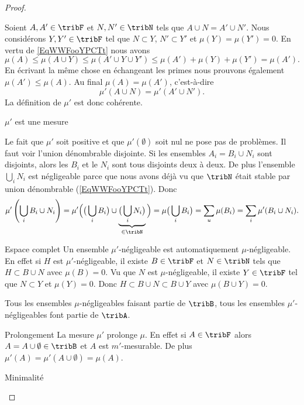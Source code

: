\begin{proof}
\begin{subproof}
            Soient \( A,A'\in\tribF\) et \( N,N'\in\tribN\) tels que \( A\cup N=A'\cup N'\). Nous considérons \( Y,Y'\in\tribF\) tel que \( N\subset Y\), \( N'\subset Y'\) et \( \mu(Y)=\mu(Y')=0\). En vertu de \eqref{EqWWFooYPCTt} nous avons
            \begin{equation}
                \mu(A)\leq \mu(A\cup Y)\leq \mu(A'\cup Y\cup Y')\leq\mu(A')+\mu(Y)+\mu(Y')=\mu(A').
            \end{equation}
            En écrivant la même chose en échangeant les primes nous prouvons également \( \mu(A')\leq \mu(A)\). Au final \( \mu(A)=\mu(A')\), c'est-à-dire
            \begin{equation}
                \mu'(A\cup N)=\mu'(A'\cup N').
            \end{equation}
            La définition de \( \mu'\) est donc cohérente.
        \item[\( \mu'\) est une mesure]

            Le fait que \( \mu'\) soit positive et que \( \mu'(\emptyset)\) soit nul ne pose pas de problèmes. Il faut voir l'union dénombrable disjointe. Si les ensembles \( A_i=B_i\cup N_i\) sont disjoints, alors les \( B_i\) et le \( N_i\) sont tous disjoints deux à deux. De plus l'ensemble \( \bigcup_iN_i\) est négligeable parce que nous avons déjà vu que \( \tribN\) était stable par union dénombrable (\ref{EqWWFooYPCTt}). Donc
            \begin{equation}
                \mu'\left( \bigcup_i B_i\cup N_i \right)=\mu'\Big( \big( \bigcup_iB_i \big)\cup\underbrace{\big( \bigcup_iN_i \big)}_{\in\tribN} \Big)=\mu\big( \bigcup_iB_i \big)=\sum_u\mu(B_i)=\sum_i\mu'(B_i\cup N_i).
            \end{equation}
        \item[Espace complet]
            Un ensemble \( \mu'\)-négligeable est automatiquement \( \mu\)-négligeable. En effet si \( H\) est \( \mu'\)-négligeable, il existe \( B\in\tribF\) et \( N\in\tribN\) tels que \( H\subset B\cup N\) avec \( \mu(B)=0\). Vu que \( N\) est \( \mu\)-négligeable, il existe \( Y\in\tribF\) tel que \( N\subset Y\) et \( \mu(Y)=0\). Donc \( H\subset B\cup N\subset B\cup Y\) avec \( \mu(B\cup Y)=0\).

            Tous les ensembles \( \mu\)-négligeables faisant partie de \( \tribB\), tous les ensembles \( \mu'\)-négligeables font partie de \( \tribA\).
        \item[Prolongement]
            La mesure \( \mu'\) prolonge \( \mu\). En effet si \( A\in\tribF\) alors \( A=A\cup\emptyset\in\tribB\) et \( A\) est \( m'\)-mesurable. De plus \( \mu'(A)=\mu'(A\cup\emptyset)=\mu(A)\).
        \item[Minimalité]


\end{subproof}
\end{proof}
